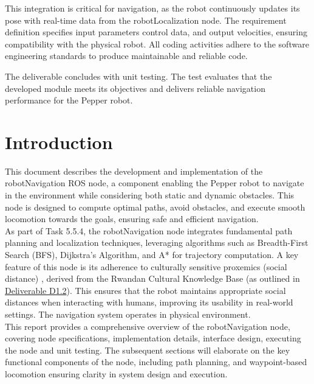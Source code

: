 \documentclass{CSSRforAfrica}
\begin{document}
\noindent This integration is critical for navigation, as the robot continuously updates its pose with real-time data from the robotLocalization node. The requirement definition specifies input parameters  control data, and output velocities, ensuring compatibility with the physical robot. All coding activities adhere to the software engineering standards to produce maintainable and reliable code.

\noindent The deliverable concludes with unit testing. The test evaluates that the developed module meets its objectives and delivers reliable navigation performance for the Pepper robot.


\newpage
\pagebreak
\tableofcontents
\newpage

\section{Introduction}
This document describes the development and implementation of the robotNavigation ROS node, a component enabling the Pepper robot to navigate in the environment while considering both static and dynamic obstacles. This node is designed to compute optimal paths, avoid obstacles, and execute smooth locomotion towards the goals, ensuring safe and efficient navigation. \\

\noindent As part of Task 5.5.4, the robotNavigation node integrates fundamental path planning and localization techniques, leveraging algorithms such as Breadth-First Search (BFS), Dijkstra’s Algorithm, and A* for trajectory computation. A key feature of this node is its adherence to culturally sensitive proxemics (social distance) , derived from the Rwandan Cultural Knowledge Base (as outlined in \href{https://cssr4africa.github.io/deliverables/CSSR4Africa_Deliverable_D1.2.pdf}{Deliverable D1.2}). This ensures that the robot maintains appropriate social distances when interacting with humans, improving its usability in real-world settings. The navigation system operates in physical environment.\\

\noindent This report provides a comprehensive overview of the robotNavigation node, covering node specifications, implementation details, interface design, executing the node and unit testing. The subsequent sections will elaborate on the key functional components of the node, including path planning, and waypoint-based locomotion ensuring clarity in system design and execution.
\end{document}
